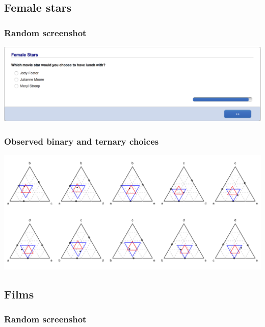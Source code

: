 \documentclass[11pt,letter]{article}
\begin{document}
\pagebreak

\subsection*{Female stars}



\subsubsection*{Random screenshot}

\includegraphics[width=15cm]{Population_study_design/screenshot_female_Stars.png}

\subsubsection*{Observed binary and ternary choices}

\includegraphics[width=15cm]{./Population_study_data/Simplexes/female_stars.pdf}

\pagebreak

\subsection*{Films}



\subsubsection*{Random screenshot}
\end{document}
